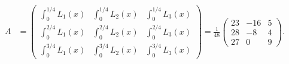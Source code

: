 \begin{solution}
\begin{align*}
A &= \begin{pmatrix}
  \int_0^{1/4} L_1(x) & \int_0^{1/4} L_2(x) & \int_0^{1/4} L_3(x)\\
  \int_0^{2/4} L_1(x) & \int_0^{2/4} L_2(x) & \int_0^{2/4} L_3(x)\\
  \int_0^{3/4} L_1(x) & \int_0^{3/4} L_2(x) & \int_0^{3/4} L_3(x)
\end{pmatrix}
= \frac{1}{48}\begin{pmatrix}
  23 & -16 & 5\\
  28 & -8 & 4\\
  27 & 0 & 9
\end{pmatrix}.
\end{align*}
\end{solution}

